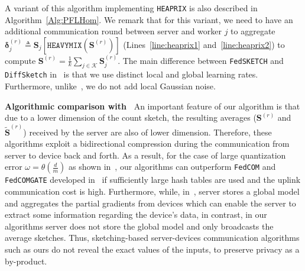 \documentclass{article} %
\begin{document}
A variant of this algorithm implementing \texttt{HEAPRIX} is also described in Algorithm~\ref{Alg:PFLHom}. 
We remark that for this variant, we need to have an additional communication round between server and worker $j$ to aggregate $\mathbf{\delta}_j^{(r)}\triangleq \mathbf{S}_j\left[\texttt{HEAVYMIX}(\mathbf{S}^{(r)})\right]$ (Lines~\ref{line:heaprix1} and~\ref{line:heaprix2}) to compute $ {\mathbf{S}}^{(r)}=\frac{1}{k}\sum_{j\in\mathcal{K}}\mathbf{S}^{(r)}_{j}$. The main difference between  \texttt{FedSKETCH} and \texttt{DiffSketch}  in~\cite{li2019privacy} is that we use distinct local and global learning rates. Furthermore, unlike~\cite{li2019privacy}, we do not add local Gaussian noise. 




\noindent\textbf{Algorithmic comparison  with~\cite{haddadpour2020federated}}
An important feature of our algorithm is that due to a lower dimension of the count sketch, the resulting averages ($\mathbf{S}^{(r)}$ and  $\tilde{\mathbf{S}}^{(r)}$) received by the server are also of lower dimension. 
Therefore, these algorithms exploit a bidirectional compression during the communication from server to device back and forth. 
As a result, for the case of large quantization error $\omega=\theta(\frac{d}{m})$ as shown in~\cite{haddadpour2020federated}, our algorithms can outperform \texttt{FedCOM} and \texttt{FedCOMGATE} developed in~\cite{haddadpour2020federated} if sufficiently large hash tables are used and the uplink communication cost is high. 
Furthermore, while, in~\cite{haddadpour2020federated}, server stores a global model and aggregates the partial gradients from devices which can enable the server to extract some information regarding the device's data, in contrast, in our algorithms server does not store the global model and only broadcasts the average sketches. 
Thus, sketching-based server-devices communication algorithms such as ours do not reveal the exact values of the inputs, to preserve privacy as a by-product.
\end{document}
